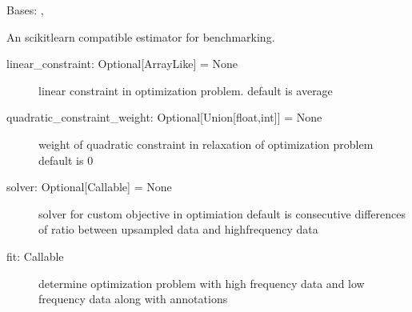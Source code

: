 \documentclass[letterpaper,10pt,english]{sphinxmanual}
\begin{document}
\begin{fulllineitems}
\label{\detokenize{benchmark:benchmark.disaggregation.Estimator}}
\sphinxAtStartPar
Bases: , 

\sphinxAtStartPar
An scikit\sphinxhyphen{}learn compatible estimator for benchmarking.
\begin{description}
\item[{linear\_constraint: Optional{[}ArrayLike{]} = None}] \leavevmode
\sphinxAtStartPar
linear constraint in optimization problem. 
default is average

\item[{quadratic\_constraint\_weight: Optional{[}Union{[}float,int{]}{]} = None}] \leavevmode
\sphinxAtStartPar
weight of quadratic constraint in relaxation of optimization problem
default is 0

\item[{solver: Optional{[}Callable{]} = None}] \leavevmode
\sphinxAtStartPar
solver for custom objective in optimiation
default is consecutive differences of ratio between up\sphinxhyphen{}sampled data and high\sphinxhyphen{}frequency data

\end{description}
\begin{description}
\item[{fit: Callable }] \leavevmode
\sphinxAtStartPar
determine optimization problem with high frequency data and low frequency data along with annotations


\end{description}
\end{fulllineitems}
\end{document}
